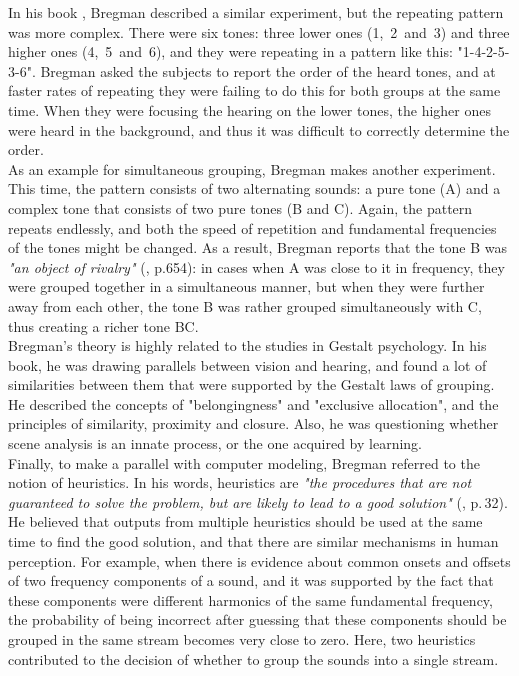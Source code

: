 In his book \cite{Bregman1990}, Bregman described a similar experiment, but the repeating pattern was more complex. There were six tones: three lower ones (1,~2~and~3) and three higher ones (4,~5~and~6), and they were repeating in a pattern like this: "1-4-2-5-3-6". Bregman asked the subjects to report the order of the heard tones, and at faster rates of repeating they were failing to do this for both groups at the same time. When they were focusing the hearing on the lower tones, the higher ones were heard in the background, and thus it was difficult to correctly determine the order.\\

As an example for simultaneous grouping, Bregman makes another experiment. This time, the pattern consists of two alternating sounds: a pure tone (A) and a complex tone that consists of two pure tones (B and C). Again, the pattern repeats endlessly, and both the speed of repetition and fundamental frequencies of the tones might be changed. As a result, Bregman reports that the tone B was \textit{"an object of rivalry"} (\cite{Bregman1990}, p.654): in cases when A was close to it in frequency, they were grouped together in a simultaneous manner, but when they were further away from each other, the tone B was rather grouped simultaneously with C, thus creating a richer tone BC.\\

Bregman's theory is highly related to the studies in Gestalt psychology. In his book, he was drawing parallels between vision and hearing, and found a lot of similarities between them that were supported by the Gestalt laws of grouping. He described the concepts of "belongingness" and "exclusive allocation", and the principles of similarity, proximity and closure. Also, he was questioning whether scene analysis is an innate process, or the one acquired by learning.\\

Finally, to make a parallel with computer modeling, Bregman referred to the notion of heuristics. In his words, heuristics are \textit{"the procedures that are not guaranteed to solve the problem, but are likely to lead to a good solution"} (\cite{Bregman1990}, p.\,32). He believed that outputs from multiple heuristics should be used at the same time to find the good solution, and that there are similar mechanisms in human perception. For example, when there is evidence about common onsets and offsets of two frequency components of a sound, and it was supported by the fact that these components were different harmonics of the same fundamental frequency, the probability of being incorrect after guessing that these components should be grouped in the same stream becomes very close to zero. Here, two heuristics contributed to the decision of whether to group the sounds into a single stream.

